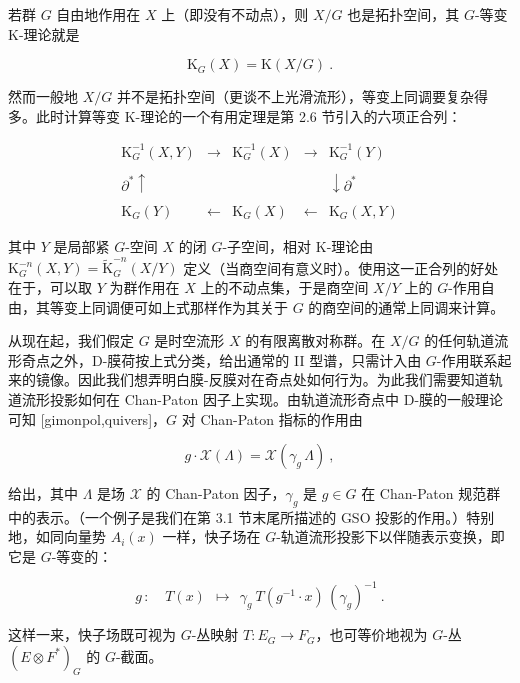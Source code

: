 \documentclass[11pt,a4paper]{ctexart}
\begin{document}
若群 \(G\) 自由地作用在 \(X\) 上（即没有不动点），则 \(X/G\) 也是拓扑空间，其 \(G\)-等变 K-理论就是

\[{\mathrm K}_G(X)={\mathrm K}(X/G)\ .\]

然而一般地 \(X/G\) 并不是拓扑空间（更谈不上光滑流形），等变上同调要复杂得多。此时计算等变 K-理论的一个有用定理是第 2.6 节引入的六项正合列：

\[{\begin{array}{ccccc}
{\mathrm K}_{G}^{-1}(X,Y)&\longrightarrow&{\mathrm K}_{G}^{-1}(X)&\longrightarrow&
{\mathrm K}_{G}^{-1}(Y)\\&
& & &\\{\scriptstyle\partial^*}\uparrow& & &
&\downarrow{\scriptstyle\partial^*}\\& & &
&\\ {\mathrm K}_{G}(Y)&\longleftarrow&{\mathrm K}_{G}(X)&\longleftarrow&{\mathrm K}_{G} (X,Y)\end{array}}\]

其中 \(Y\) 是局部紧 \(G\)-空间 \(X\) 的闭 \(G\)-子空间，相对 K-理论由 \({\mathrm K}_{G}^{-n}(X,Y)=\widetilde{{\mathrm K}}_{G}^{-n}(X/Y)\) 定义（当商空间有意义时）。使用这一正合列的好处在于，可以取 \(Y\) 为群作用在 \(X\) 上的不动点集，于是商空间 \(X/Y\) 上的 \(G\)-作用自由，其等变上同调便可如上式那样作为其关于 \(G\) 的商空间的通常上同调来计算。

从现在起，我们假定 \(G\) 是时空流形 \(X\) 的有限离散对称群。在 \(X/G\) 的任何轨道流形奇点之外，D-膜荷按上式分类，给出通常的 II 型谱，只需计入由 \(G\)-作用联系起来的镜像。因此我们想弄明白膜-反膜对在奇点处如何行为。为此我们需要知道轨道流形投影如何在 Chan-Paton 因子上实现。由轨道流形奇点中 D-膜的一般理论可知 [gimonpol,quivers]，\(G\) 对 Chan-Paton 指标的作用由

\[g\cdot{\mathcal X}(\Lambda)={\mathcal X}(\gamma_g\,\Lambda)\ ,\]

给出，其中 \(\Lambda\) 是场 \(\mathcal X\) 的 Chan-Paton 因子，\(\gamma_g\) 是 \(g\in G\) 在 Chan-Paton 规范群中的表示。（一个例子是我们在第 3.1 节末尾所描述的 GSO 投影的作用。）特别地，如同向量势 \(A_i(x)\) 一样，快子场在 \(G\)-轨道流形投影下以伴随表示变换，即它是 \(G\)-等变的：

\[g\,:\,~~~~T(x)~~\longmapsto~~\gamma_g~T\left(g^{-1}\cdot x\right)
\,(\gamma_g)^{-1}\ .\]

这样一来，快子场既可视为 \(G\)-丛映射 \(T: E_G\rightarrow F_G\)，也可等价地视为 \(G\)-丛 \((E\otimes F^*)_G\) 的 \(G\)-截面。
\end{document}
